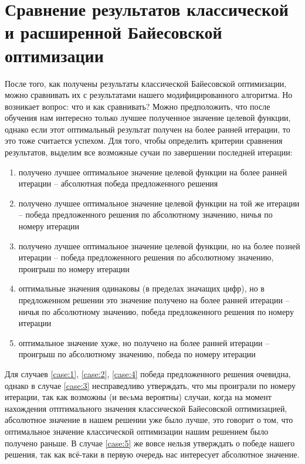 \documentclass[times,specification,annotation]{itmo-student-thesis}
\begin{document}
	\section{Сравнение результатов классической и расширенной Байесовской оптимизации}
	После того, как получены результаты классической Байесовской оптимизации, можно сравнивать их с результатами нашего модифицированного алгоритма. Но возникает вопрос: что и как сравнивать? Можно предположить, что после обучения нам интересно только лучшее полученное значение целевой функции, однако если этот оптимальный результат получен на более ранней итерации, то это тоже считается успехом. Для того, чтобы определить критерии сравнения результатов, выделим все возможные сучаи по завершении последней итерации:
	\begin{enumerate}
		\item получено лучшее оптимальное значение целевой функции на более ранней итерации -- абсолютная победа предложенного решения \label{case:1}
		\item получено лучшее оптимальное значение целевой функции на той же итерации -- победа предложенного решения по абсолютному значению, ничья по номеру итерации \label{case:2}
		\item получено лучшее оптимальное значение целевой функции, но на более позней итерации -- победа предложенного решения по абсолютному значению, проигрыш по номеру итерации  \label{case:3}
		\item оптимальные значения одинаковы (в пределах значащих цифр), но в предложенном решении это значение получено на более ранней итерации -- ничья по абсолютному значению, победа предложенного решения по номеру итерации \label{case:4}
		\item оптимальное значение хуже, но получено на более ранней итерации -- проигрыш по абсолютному значению, победа по номеру итерации  \label{case:5}
	\end{enumerate} \par

	Для случаев \ref{case:1}, \ref{case:2}, \ref{case:4} победа предложенного решения очевидна, однако в случае \ref{case:3} несправедливо утверждать, что мы проиграли по номеру итерации, так как возможны (и веcьма вероятны) случаи, когда на момент нахождения отптимального значения классической Байесовской оптимизацией, абсолютное значение в нашем решении уже было лучше, это говорит о том, что оптимальное значение классической оптимизации нашим решением было получено раньше. В случае \ref{case:5} же вовсе нельзя утверждать о победе нашего решения, так как всё-таки в первую очередь нас интересует абсолютное значение. \par
\end{document}
